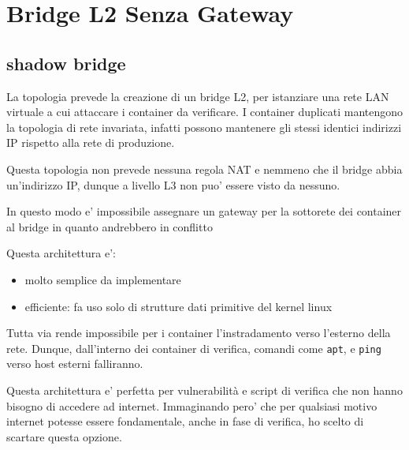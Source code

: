 \section{Bridge L2 Senza Gateway}\label{bridge-l2-senza-gateway}

\subsection{shadow bridge}\label{shadow-bridge}

La topologia prevede la creazione di un bridge L2, per istanziare una
rete LAN virtuale a cui attaccare i container da verificare. I container
duplicati mantengono la topologia di rete invariata, infatti possono
mantenere gli stessi identici indirizzi IP rispetto alla rete di
produzione.

Questa topologia non prevede nessuna regola NAT e nemmeno che il bridge
abbia un'indirizzo IP, dunque a livello L3 non puo' essere visto da
nessuno.

In questo modo e' impossibile assegnare un gateway per la sottorete dei
container al bridge in quanto andrebbero in conflitto

Questa architettura e':

\begin{itemize}
\tightlist
\item
  molto semplice da implementare
\item
  efficiente: fa uso solo di strutture dati primitive del kernel linux
\end{itemize}

Tutta via rende impossibile per i container l'instradamento verso
l'esterno della rete. Dunque, dall'interno dei container di verifica,
comandi come \passthrough{\lstinline!apt!}, e
\passthrough{\lstinline!ping!} verso host esterni falliranno.

Questa architettura e' perfetta per vulnerabilità e script di verifica
che non hanno bisogno di accedere ad internet. Immaginando pero' che per
qualsiasi motivo internet potesse essere fondamentale, anche in fase di
verifica, ho scelto di scartare questa opzione.

